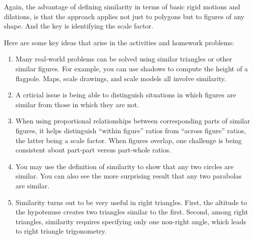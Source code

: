 Again, the advantage of defining similarity in terms of basic rigid motions and dilations, is that the approach 
applies not just to polygons but to figures of any shape.  And the key is identifying the scale factor.  


Here are some key ideas that arise in the activities and homework problems: 
\begin{enumerate}
\item Many real-world problems can be solved using similar triangles or other similar figures.  For example, you can use shadows to 
compute the height of a flagpole.  Maps, scale drawings, and scale models all involve similarity.  

\item A crticial issue is being able to distinguish situations in which figures are similar from those in which they are not.  

\item When using proportional relationships between corresponding parts of similar figures, it helps distinguish ``within figure'' ratios from ``across figure'' ratios, the latter being a scale factor.  When figures overlap, one challenge is being consistent about part-part versus part-whole ratios.

\item You may use the definition of similarity to show that any two circles are similar.  You can also see the more surprising result that any two parabolas are similar.  

\item Similarity turns out to be very useful in right triangles.  First, the altitude to the hypotenuse creates two triangles similar to the first.  Second, among right triangles, similarity requires specifying only one non-right angle, which leads to right triangle trigonometry.  
\end{enumerate}


